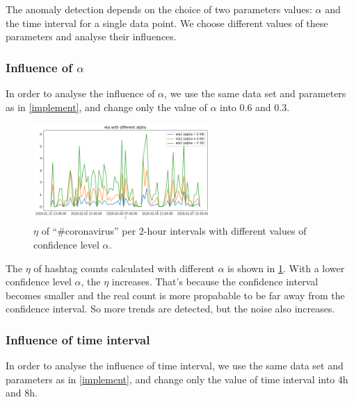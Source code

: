 The anomaly detection depends on the choice of two parameters values: $\alpha$ and the time interval for a single data point. We choose different values of these parameters and analyse their influences.

\subsubsection*{Influence of $\alpha$}

In order to analyse the influence of $\alpha$, we use the same data set and parameters as in \ref{implement}, and change only the value of $\alpha$ into 0.6 and 0.3.

\begin{figure}[H]
    \centering
    \includegraphics[width=0.6\textwidth]{images/eta_coronavirus_2h.png}
    \caption{$\eta$ of “\#coronavirus” per 2-hour intervals with different values of confidence level $\alpha$.}
    \label{fig:eta_coronavirus_2h}
\end{figure}

The $\eta$ of hashtag counts calculated with different $\alpha$ is shown in \ref{fig:eta_coronavirus_2h}. With a lower confidence level $\alpha$, the $\eta$ increases. That's because the confidence interval becomes smaller and the real count is more propabable to be far away from the confidence interval. So more trends are detected, but the noise also increases.

\subsubsection*{Influence of time interval}

In order to analyse the influence of time interval, we use the same data set and parameters as in \ref{implement}, and change only the value of time interval into 4h and 8h.

